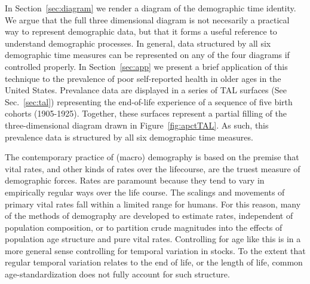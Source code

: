 \documentclass[12pt,oneside,a4paper]{article} %
\theoremstyle{definition}
\begin{document}
In Section~\ref{sec:diagram} we render a diagram of the demographic time
identity. We argue that the full three dimensional diagram is not necesarily a
practical way to represent demographic data, but that it forms a useful
reference to understand demographic processes. In general, data structured by
all six demographic time measures can be represented on any of the four diagrams
if controlled properly. In Section~\ref{sec:app} we present a brief
application of this technique to the prevalence of poor self-reported health in
older ages in the United States. Prevalance data are displayed in a series of
TAL surfaces (See Sec.~\ref{sec:tal}) representing the end-of-life experience of
a sequence of five birth cohorts (1905-1925). Together, these surfaces represent
a partial filling of the three-dimensional diagram drawn in
Figure~\ref{fig:apctTAL}. As such, this prevalence data is structured by all six
demographic time measures.



The contemporary practice of (macro) demography is based on the premise that
vital rates, and other kinds of rates over the lifecourse, are the truest measure of
demographic forces. Rates are paramount because they tend to vary in
empirically regular ways over the life course. The scalings and movements of
primary vital rates fall within a limited range for humans. For this reason, many of the methods of
demography are developed to estimate rates, independent of population composition, or to
partition crude magnitudes into the effects of population age structure and
pure vital rates. Controlling for age like this is in a more general sense
controlling for temporal variation in stocks. To the extent that regular temporal variation
relates to the end of life, or the length of life, common
age-standardization does not fully account for such structure.
\end{document}
